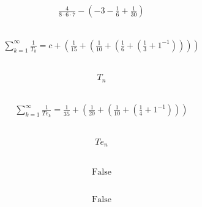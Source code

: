 \documentclass[12pt]{article}
\begin{document}
\subsection{}
\begin{align*}
\frac{4}{8 \cdot 6 \cdot 7} - \left(-3 - \frac{1}{6} + \frac{1}{30}\right)
\end{align*}
\vspace{1cm}
\subsection{}
\begin{align*}
\sum_{k=1}^{\infty} \frac{1}{T_{k}} = c + \left(\frac{1}{15} + \left(\frac{1}{10} + \left(\frac{1}{6} + \left(\frac{1}{3} + 1^{-1}\right)\right)\right)\right)
\end{align*}
\vspace{1cm}
\subsection{}
\begin{align*}
T_{n}
\end{align*}
\vspace{1cm}
\subsection{}
\begin{align*}
\sum_{k=1}^{\infty} \frac{1}{T e_{k}} = \frac{1}{35} + \left(\frac{1}{20} + \left(\frac{1}{10} + \left(\frac{1}{4} + 1^{-1}\right)\right)\right)
\end{align*}
\vspace{1cm}
\subsection{}
\begin{align*}
T e_{n}
\end{align*}
\vspace{1cm}
\subsection{}
\begin{align*}
\text{False}
\end{align*}
\vspace{1cm}
\subsection{}
\begin{align*}
\text{False}
\end{align*}
\vspace{1cm}
\end{document}
